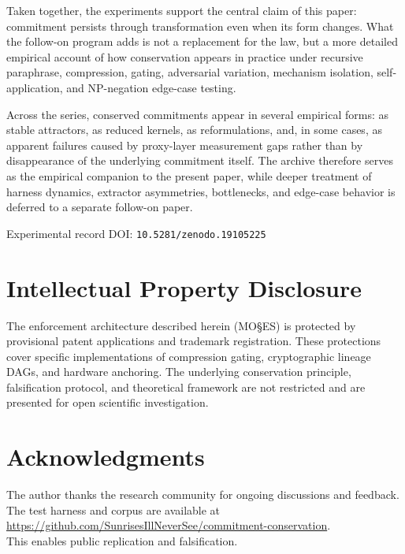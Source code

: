 \documentclass[11pt,a4paper]{article}
\begin{document}
Taken together, the experiments support the central claim of this paper: commitment persists through transformation even when its form changes. What the follow-on program adds is not a replacement for the law, but a more detailed empirical account of how conservation appears in practice under recursive paraphrase, compression, gating, adversarial variation, mechanism isolation, self-application, and NP-negation edge-case testing.

Across the series, conserved commitments appear in several empirical forms: as stable attractors, as reduced kernels, as reformulations, and, in some cases, as apparent failures caused by proxy-layer measurement gaps rather than by disappearance of the underlying commitment itself. The archive therefore serves as the empirical companion to the present paper, while deeper treatment of harness dynamics, extractor asymmetries, bottlenecks, and edge-case behavior is deferred to a separate follow-on paper.

\medskip
\noindent Experimental record DOI: \texttt{10.5281/zenodo.19105225}

\section*{Intellectual Property Disclosure}

The enforcement architecture described herein (MO\S{}ES\texttrademark{}) is protected by provisional patent applications and trademark registration. These protections cover specific implementations of compression gating, cryptographic lineage DAGs, and hardware anchoring. The underlying conservation principle, falsification protocol, and theoretical framework are not restricted and are presented for open scientific investigation.

\section*{Acknowledgments}

The author thanks the research community for ongoing discussions and feedback. The test harness and corpus are available at\\
{\sloppy\url{https://github.com/SunrisesIllNeverSee/commitment-conservation}}.\\
This enables public replication and falsification.
\end{document}
